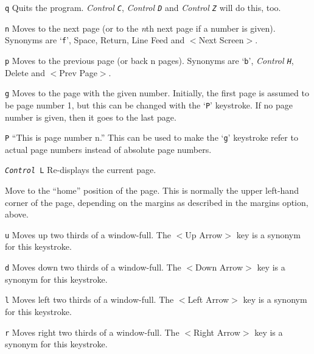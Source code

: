 \begin{list}%
{}%
{\settowidth{\labelwidth}{\em Control \tt L}
\settowidth{\labelsep}{aaaa}
\settowidth{\rightmargin}{aaa}
\addtolength{\labelwidth}{\labelsep}
\setlength{\leftmargin}{\labelwidth}}
%
\item[\tt q]
Quits the program.  {\em Control \tt C}, {\em Control \tt D} and  {\em Control
\tt Z} will do this, 
too.

\item[\tt n]
Moves to the next page (or to the {\em n}th next page if a number is given).
Synonyms are `{\tt f}', Space, Return, Line Feed and $<$Next Screen$>$.

\item[\tt p]
Moves to the previous page (or back n pages).  Synonyms are
`{\tt b}', {\em Control \tt H}, Delete and $<$Prev Page$>$.

\item[\tt g]
Moves to the page with the given number.  Initially, the first page is assumed
to be page number 1, but this can be changed with the `{\tt P}' keystroke. 
If no page number is given, then it goes to the last page.

\item[\tt P]
``This is page number n.''  This can be used to make the `{\tt g}'
keystroke refer to actual page numbers instead of absolute page numbers.

\item[\tt {\em Control} L]
Re-displays the current page.

\item[\tt \symbol{94}]
Move to the ``home'' position of the page.  This is normally the upper
left-hand corner of the page, depending on the margins as described in
the \-margins option, above.

\item[\tt u]
Moves up two thirds of a window-full. The $<$Up Arrow$>$ key is a synonym for
this keystroke.                       

\item[\tt d] Moves down two thirds of a window-full. The $<$Down Arrow$>$ key
is a synonym for this keystroke.                       

\item[\tt l] Moves left two thirds of a window-full. The $<$Left Arrow$>$ key
is a synonym for this keystroke.                       

\item[\tt r] Moves right two thirds of a window-full. The $<$Right Arrow$>$ key
is a synonym for this keystroke.                       


\end{list}

